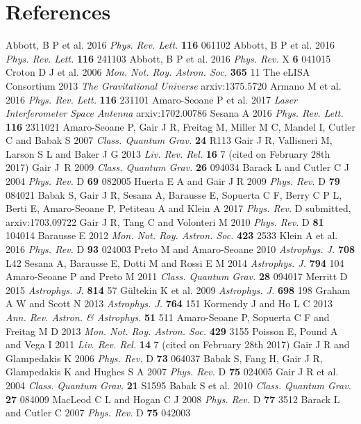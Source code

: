 \documentclass[a4paper]{jpconf}
\begin{document}
\section*{References}
\begin{thebibliography}{9}
Abbott, B P et al. 2016 {\it Phys. Rev. Lett.} {\bf 116} 061102
Abbott, B P et al. 2016 {\it Phys. Rev. Lett.} {\bf 116} 241103
Abbott, B P et al. 2016 {\it Phys. Rev.} X {\bf 6} 041015
Croton D J et al. 2006 {\it Mon. Not. Roy. Astron. Soc.} {\bf 365} 11
The eLISA Consortium 2013 {\it The Gravitational Universe} arxiv:1375.5720
Armano M et al. 2016 {\it Phys. Rev. Lett.} {\bf 116} 231101
Amaro-Seoane P et al. 2017 {\it Laser Interferometer Space Antenna} arxiv:1702.00786
Sesana A 2016 {\it Phys. Rev. Lett.} {\bf 116} 2311021
Amaro-Seoane P, Gair J R, Freitag M, Miller M C, Mandel I, Cutler C and Babak S 2007 {\it Class. Quantum Grav.} \textbf{24} R113
Gair J R, Vallisneri M, Larson S L and Baker J G 2013 {\it Liv. Rev. Rel.} \textbf{16} 7 (cited on February 28th 2017)
Gair J~R 2009 {\it Class. Quantum Grav.} \textbf{26} 094034
Barack L and Cutler C J 2004 {\it Phys. Rev.} D {\bf 69} 082005
Huerta E A and Gair J R 2009 {\it Phys. Rev.} D {\bf 79} 084021
Babak S, Gair J R, Sesana A, Barausse E, Sopuerta C F, Berry C P L, Berti E, Amaro-Seoane P, Petiteau A and Klein A 2017  {\it Phys. Rev.} D submitted, arxiv:1703.09722
Gair J R, Tang C and Volonteri M 2010 {\it Phys. Rev.} D \textbf{81} 104014
Barausse E 2012 {\it Mon. Not. Roy. Astron. Soc.} {\bf 423} 2533
Klein A et al. 2016 {\it Phys. Rev.} D {\bf 93} 024003
Preto M and Amaro-Seoane 2010 {\it Astrophys. J.} {\bf 708} L42
Sesana A, Barausse E, Dotti M and Rossi E M 2014 {\it Astrophys. J.} {\bf 794} 104
Amaro-Seoane P and Preto M 2011 {\it Class. Quantum Grav.} {\bf 28} 094017
Merritt D 2015 {\it Astrophys. J.} {\bf 814} 57
G\"{u}ltekin K et al. 2009 {\it Astrophys. J.} {\bf 698} 198
Graham A W and Scott N 2013 {\it Astrophys. J.} {\bf 764} 151
Kormendy J and Ho L C 2013 {\it Ann. Rev. Astron. \& Astrophys.} {\bf 51} 511
Amaro-Seoane P, Sopuerta C F and Freitag M D 2013 {\it Mon. Not. Roy. Astron. Soc.} {\bf 429} 3155
Poisson  E, Pound A and Vega I 2011 {\it Liv. Rev. Rel.} \textbf{14} 7 (cited on February 28th 2017)
Gair J R and Glampedakis K 2006 {\it Phys. Rev.} D {\bf 73} 064037
Babak S, Fang H, Gair J R, Glampedakis K and Hughes S A 2007 {\it Phys. Rev.} D {\bf 75} 024005
Gair J R et al. 2004 {\it Class. Quantum Grav.} {\bf 21} S1595
Babak S et al. 2010 {\it Class. Quantum Grav.} {\bf 27} 084009
MacLeod C L and Hogan C J 2008 {\it Phys. Rev.} D \textbf{77} 3512
Barack L and Cutler C 2007 {\it Phys. Rev.} D {\bf 75} 042003
  \end{thebibliography}
\end{document}
